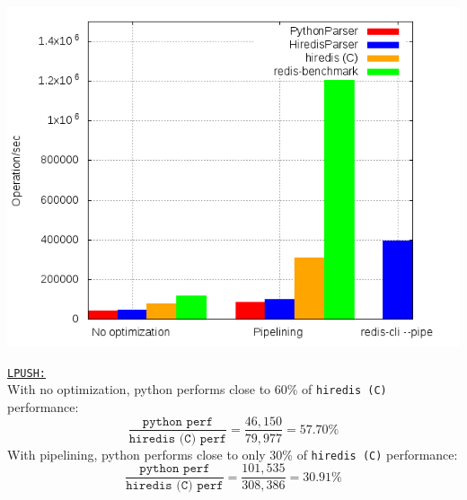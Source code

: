 \documentclass[a4paper, 11pt]{report}
\begin{document}
\newpage

\begin{minipage}{0.55\linewidth}
    \includegraphics[width=1.07\linewidth]{plots/pushing.png}
\end{minipage}
\begin{minipage}{0.4\linewidth}
    \underline{\texttt{LPUSH:}}\\

    With no optimization, python performs close to 60\% of \texttt{hiredis (C)} performance:
    $$\frac{\texttt{python perf}}{\texttt{hiredis (C) perf}}=\frac{46,150}{79,977}=57.70\%$$
    With pipelining, python performs close to only 30\% of \texttt{hiredis (C)} performance:
    $$\frac{\texttt{python perf}}{\texttt{hiredis (C) perf}}=\frac{101,535}{308,386}=30.91\%$$
\end{minipage}
\end{document}
